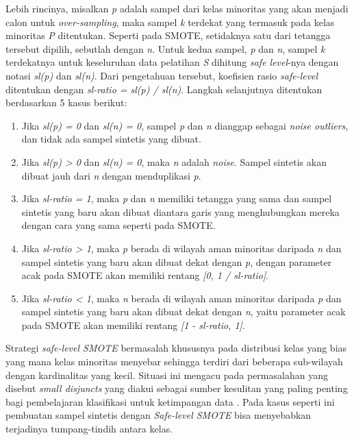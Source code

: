 Lebih rincinya, misalkan \textit{p} adalah sampel dari kelas minoritas yang akan menjadi calon untuk \textit{over-sampling}, maka sampel \textit{k} terdekat yang termasuk pada kelas minoritas \textit{P} ditentukan.
Seperti pada SMOTE, setidaknya satu dari tetangga tersebut dipilih, sebutlah dengan \textit{n}.
Untuk kedua sampel, \textit{p} dan \textit{n}, sampel \textit{k} terdekatnya untuk keseluruhan data pelatihan \textit{S} dihitung \textit{safe level}-nya dengan notasi \textit{sl(p)} dan \textit{sl(n)}.
Dari pengetahuan tersebut, koefisien rasio \textit{safe-level} ditentukan dengan \textit{sl-ratio = sl(p) / sl(n)}.
Langkah selanjutnya ditentukan berdasarkan 5 kasus berikut:
\begin{enumerate}
	\item \label{case:safe-1} Jika \textit{sl(p) = 0} dan \textit{sl(n) = 0}, sampel \textit{p} dan \textit{n} dianggap sebagai \textit{noise outliers}, dan tidak ada sampel sintetis yang dibuat.
	\item Jika \textit{sl(p) > 0} dan \textit{sl(n) = 0}, maka \textit{n} adalah \textit{noise}.
Sampel sintetis akan dibuat jauh dari \textit{n} dengan menduplikasi \textit{p}.
	\item Jika \textit{sl-ratio = 1}, maka \textit{p} dan \textit{n} memiliki tetangga yang sama dan sampel sintetis yang baru akan dibuat diantara garis yang menghubungkan mereka dengan cara yang sama seperti pada SMOTE.
	\item Jika \textit{sl-ratio > 1}, maka \textit{p} berada di wilayah aman minoritas daripada \textit{n} dan sampel sintetis yang baru akan dibuat dekat dengan \textit{p}, dengan parameter acak pada SMOTE akan memiliki rentang \textit{[0, 1 / sl-ratio]}.
	\item Jika \textit{sl-ratio < 1}, maka \textit{n} berada di wilayah aman minoritas daripada \textit{p} dan sampel sintetis yang baru akan dibuat dekat dengan \textit{n}, yaitu parameter acak pada SMOTE akan memiliki rentang \textit{[1 - sl-ratio, 1]}.
\end{enumerate}

Strategi \textit{safe-level SMOTE} bermasalah khususnya pada distribusi kelas yang bias yang mana kelas minoritas menyebar sehingga terdiri dari beberapa sub-wilayah dengan kardinalitas yang kecil.
Situasi ini mengacu pada permasalahan yang disebut \textit{small disjuncts} yang diakui sebagai sumber kesulitan yang paling penting bagi pembelajaran klasifikasi untuk ketimpangan data \cite{jo2004class}. 
Pada kasus seperti ini pembuatan sampel sintetis dengan \textit{Safe-level SMOTE} bisa menyebabkan terjadinya tumpang-tindih antara kelas.

